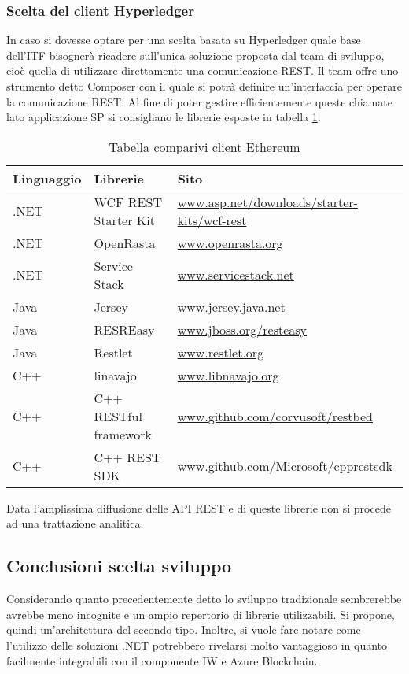 \subsubsection{Scelta del client Hyperledger}
In caso si dovesse optare per una scelta basata su Hyperledger quale base dell’ITF bisognerà ricadere sull’unica soluzione proposta dal team di sviluppo, cioè quella di utilizzare direttamente una comunicazione REST. Il team offre uno strumento detto Composer con il quale si potrà definire un’interfaccia per operare la comunicazione REST. Al fine di poter gestire efficientemente queste chiamate lato applicazione SP si consigliano le librerie esposte in tabella \ref{tab:comp-client-hyp}.
\begin{table}[!h] %
    \caption{Tabella comparivi client Ethereum}
    \label{tab:comp-client-hyp}
    \begin{tabularx}{\textwidth}{|X|X|X|}
    \hline
    \textbf{Linguaggio} & \textbf{Librerie} & \textbf{Sito}\\
    \hline
    .NET   & WCF REST Starter Kit  & \url{www.asp.net/downloads/starter-kits/wcf-rest} \\
    \hline
    .NET   & OpenRasta & \url{www.openrasta.org} \\
    \hline
    .NET   & Service Stack  & \url{www.servicestack.net} \\
    \hline
    Java  & Jersey & \url{www.jersey.java.net} \\
    \hline
    Java  & RESREasy & \url{www.jboss.org/resteasy}\\
    \hline
    Java  & Restlet & \url{www.restlet.org}\\
    \hline
    C++  & linavajo & \url{www.libnavajo.org}\\
    \hline
    C++  & C++ RESTful framework & \url{www.github.com/corvusoft/restbed}\\
    \hline
    C++  & C++ REST SDK & \url{www.github.com/Microsoft/cpprestsdk}\\
    \hline
    \end{tabularx}
\end{table}%
Data l’amplissima diffusione delle API REST e di queste librerie non si procede ad una trattazione analitica.
\subsection{Conclusioni scelta sviluppo}
Considerando quanto precedentemente detto lo sviluppo tradizionale sembrerebbe avrebbe meno incognite e un ampio repertorio di librerie utilizzabili. Si propone, quindi un’architettura del secondo tipo.
Inoltre, si vuole fare notare come l’utilizzo delle soluzioni .NET potrebbero rivelarsi molto vantaggioso in quanto facilmente integrabili con il componente IW e Azure Blockchain.
